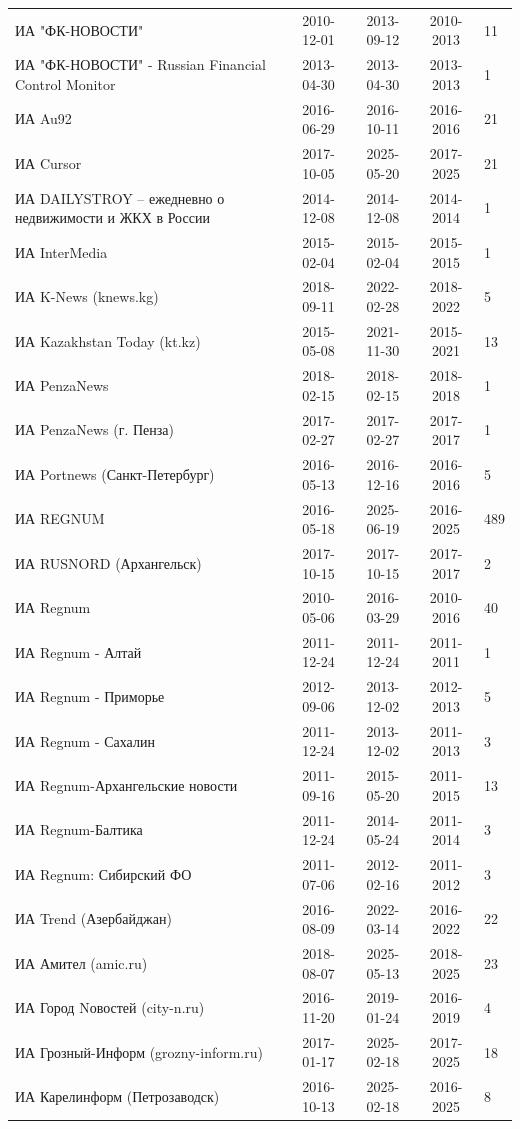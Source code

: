 \begin{longtable}{p{6cm}cccp{2cm}}
ИА "ФК-НОВОСТИ" & 2010-12-01 & 2013-09-12 & 2010-2013 & 11\\
ИА "ФК-НОВОСТИ" - Russian Financial Control Monitor & 2013-04-30 & 2013-04-30 & 2013-2013 & 1\\
ИА Au92 & 2016-06-29 & 2016-10-11 & 2016-2016 & 21\\
ИА Cursor & 2017-10-05 & 2025-05-20 & 2017-2025 & 21\\
ИА DAILYSTROY – ежедневно о недвижимости и ЖКХ в России & 2014-12-08 & 2014-12-08 & 2014-2014 & 1\\
ИА InterMedia & 2015-02-04 & 2015-02-04 & 2015-2015 & 1\\
ИА K-News (knews.kg) & 2018-09-11 & 2022-02-28 & 2018-2022 & 5\\
ИА Kazakhstan Today (kt.kz) & 2015-05-08 & 2021-11-30 & 2015-2021 & 13\\
ИА PenzaNews & 2018-02-15 & 2018-02-15 & 2018-2018 & 1\\
ИА PenzaNews (г. Пенза) & 2017-02-27 & 2017-02-27 & 2017-2017 & 1\\
ИА Portnews (Санкт-Петербург) & 2016-05-13 & 2016-12-16 & 2016-2016 & 5\\
ИА REGNUM & 2016-05-18 & 2025-06-19 & 2016-2025 & 489\\
ИА RUSNORD (Архангельск) & 2017-10-15 & 2017-10-15 & 2017-2017 & 2\\
ИА Regnum & 2010-05-06 & 2016-03-29 & 2010-2016 & 40\\
ИА Regnum - Алтай & 2011-12-24 & 2011-12-24 & 2011-2011 & 1\\
ИА Regnum - Приморье & 2012-09-06 & 2013-12-02 & 2012-2013 & 5\\
ИА Regnum - Сахалин & 2011-12-24 & 2013-12-02 & 2011-2013 & 3\\
ИА Regnum-Архангельские новости & 2011-09-16 & 2015-05-20 & 2011-2015 & 13\\
ИА Regnum-Балтика & 2011-12-24 & 2014-05-24 & 2011-2014 & 3\\
ИА Regnum: Сибирский ФО & 2011-07-06 & 2012-02-16 & 2011-2012 & 3\\
ИА Trend (Азербайджан) & 2016-08-09 & 2022-03-14 & 2016-2022 & 22\\
ИА Амител (amic.ru) & 2018-08-07 & 2025-05-13 & 2018-2025 & 23\\
ИА Город Nовостей (city-n.ru) & 2016-11-20 & 2019-01-24 & 2016-2019 & 4\\
ИА Грозный-Информ (grozny-inform.ru) & 2017-01-17 & 2025-02-18 & 2017-2025 & 18\\
ИА Карелинформ (Петрозаводск) & 2016-10-13 & 2025-02-18 & 2016-2025 & 8\\

\end{longtable}
